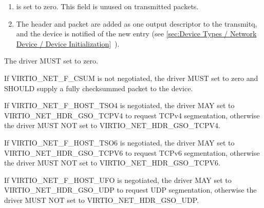 \begin{enumerate}
\begin{itemize}
  \begin{note}
  Some devices benefit from knowledge of the exact header length.
  \end{note}

  \item {} is the maximum size of each packet beyond that
    header (ie. MSS).

  \item If the driver negotiated the VIRTIO_NET_F_HOST_ECN feature,
    the VIRTIO_NET_HDR_GSO_ECN bit in 
    indicates that the TCP packet has the ECN bit set\footnote{This case is not handled by some older hardware, so is called out
specifically in the protocol.}.
   \end{itemize}

\item {} is set to zero.  This field is unused on transmitted packets.

\item The header and packet are added as one output descriptor to the
  transmitq, and the device is notified of the new entry
  (see \ref{sec:Device Types / Network Device / Device Initialization}~).
\end{enumerate}


The driver MUST set  to zero.

If VIRTIO_NET_F_CSUM is not negotiated, the driver MUST set
 to zero and SHOULD supply a fully checksummed
packet to the device.

If VIRTIO_NET_F_HOST_TSO4 is negotiated, the driver MAY set
 to VIRTIO_NET_HDR_GSO_TCPV4 to request TCPv4
segmentation, otherwise the driver MUST NOT set
 to VIRTIO_NET_HDR_GSO_TCPV4.

If VIRTIO_NET_F_HOST_TSO6 is negotiated, the driver MAY set
 to VIRTIO_NET_HDR_GSO_TCPV6 to request TCPv6
segmentation, otherwise the driver MUST NOT set
 to VIRTIO_NET_HDR_GSO_TCPV6.

If VIRTIO_NET_F_HOST_UFO is negotiated, the driver MAY set
 to VIRTIO_NET_HDR_GSO_UDP to request UDP
segmentation, otherwise the driver MUST NOT set
 to VIRTIO_NET_HDR_GSO_UDP.

